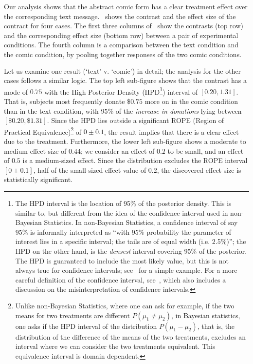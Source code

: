  

Our analysis shows that the abstract comic form has a clear treatment effect over the corresponding text message.~ shows the contrast and the effect size of the contract for four cases. The first three columns of~ show the contrasts (top row) and the corresponding effect size (bottom row) between a pair of experimental conditions. The fourth column is a comparison between the text condition and the comic condition, by pooling together responses of the two comic conditions.

Let us examine one result (`text' v. `comic') in detail; the analysis for the other cases follows a similar logic. The top left sub-figure shows that the contrast has a mode of $0.75$ with the High Posterior Density (HPD\footnote{The HPD interval is the location of 95\% of the posterior density. This is similar to, but different from the idea of the confidence interval used in non-Bayesian Statistics. In non-Bayesian Statistics, a confidence interval of say 95\% is informally interpreted as ``with 95\% probability the parameter of interest lies in a specific interval; the tails are of equal width (i.e. 2.5\%)''; the HPD on the other hand, is the \textit{densest} interval covering 95\% of the posterior. The HPD is guaranteed to include the most likely value, but this is not always true for confidence intervals; see~\textcite[][p. 57]{McElreath2015} for a simple example. For a more careful definition of the confidence interval, see~\textcite{Hoekstra2014}, which also includes a discussion on the misinterpretation of confidence intervals.}) interval of $[0.20, 1.31]$. That is, subjects most frequently donate $\$0.75$ more on in the comic condition than in the text condition, with 95\% of the \textit{increase in donations} lying between $[\$0.20, \$1.31]$. Since the HPD lies outside a significant ROPE (Region of Practical Equivalence)\footnote{Unlike non-Bayesian Statistics, where one can ask for example, if the two means for two treatments are different $P(\mu_1\neq \mu_2)$, in Bayesian statistics, one asks if the HPD interval of the distribution $P(\mu_1-\mu_2)$, that is, the distribution of the difference of the means of the two treatments, excludes an interval where we can consider the two treatments equivalent. This equivalence interval is domain dependent. } of $0 \pm 0.1$, the result implies that there is a clear effect due to the treatment. Furthermore, the lower left sub-figure shows a moderate to medium effect size of $0.44$; we consider an effect of $0.2$ to be small, and an effect of $0.5$ is a medium-sized effect. Since the distribution excludes the ROPE interval $[0 \pm 0.1]$, half of the small-sized effect value of $0.2$, the discovered effect size is statistically significant. 

